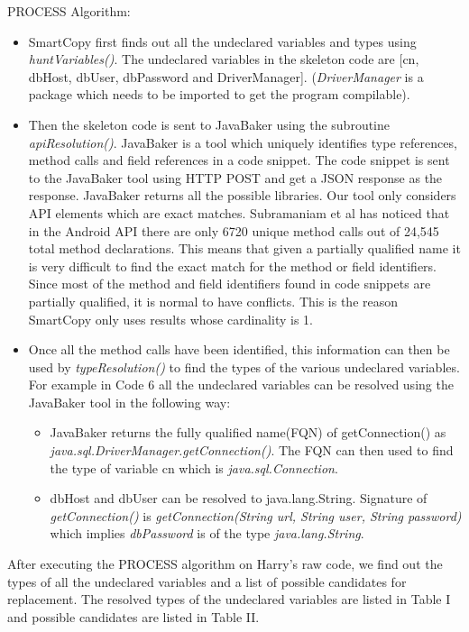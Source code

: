 PROCESS Algorithm:
\begin{itemize}
\item SmartCopy first finds out all the undeclared variables and types using \textit{huntVariables()}. The undeclared variables in the skeleton code are [cn, dbHost, dbUser, dbPassword and DriverManager]. (\textit{DriverManager} is a package which needs to be imported to get the program compilable).
\item Then the skeleton code is sent to JavaBaker using the subroutine \textit{apiResolution()}. JavaBaker is a tool which uniquely identifies type references, method calls and field references in a code snippet. The code snippet is sent to the JavaBaker tool using HTTP POST and get a JSON response as the response.  JavaBaker returns all the possible libraries. Our tool only considers API elements which are exact matches. Subramaniam et al has noticed that in the Android API there are only 6720 unique method calls out of 24,545 total method declarations. This means that given a partially qualified name it is very difficult to find the exact match for the method or field identifiers. Since most of the method and field identifiers found in code snippets are partially qualified, it is normal to have conflicts. This is the reason SmartCopy only uses results whose cardinality is 1. 
\item Once all the method calls have been identified, this information can then be used by \textit{typeResolution()} to find the types of the various undeclared variables. For example in Code 6 all the undeclared variables can be resolved using the JavaBaker tool in the following way:
\begin{itemize}  
\item JavaBaker returns the fully qualified name(FQN) of getConnection() as \textit{java.sql.DriverManager.getConnection()}. The FQN can then used to find the type of variable cn which is \textit{java.sql.Connection}. 
\item dbHost and dbUser can be resolved to java.lang.String. Signature of \textit{getConnection()} is \textit{getConnection(String url, String user, String password)} which implies \textit{dbPassword} is of the type \textit{java.lang.String}. 
\end{itemize}
\end{itemize}

After executing the PROCESS algorithm on Harry\rq s raw code, we find out the types of all the undeclared variables and a list of possible candidates for replacement. The resolved types of the undeclared variables are listed in Table I and possible candidates are listed in Table II.

